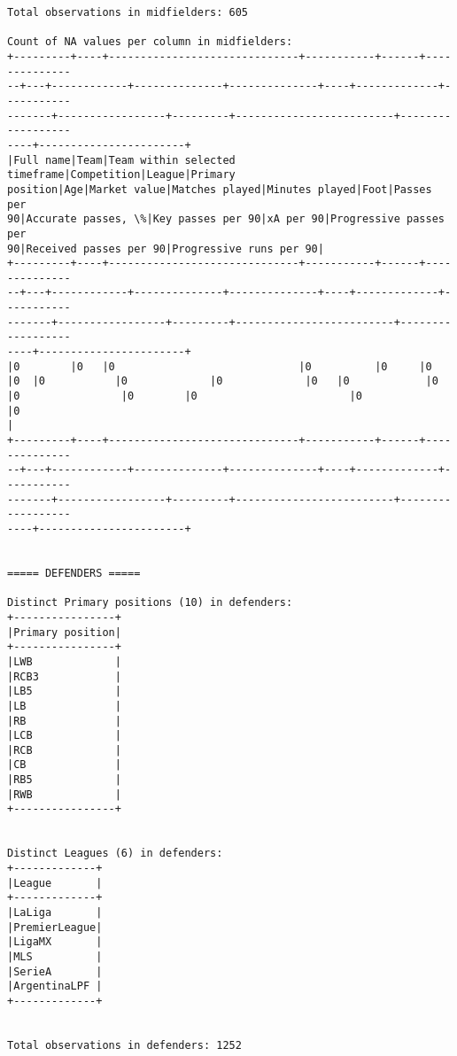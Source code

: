 \documentclass[11pt]{article}
\begin{document}
\begin{Verbatim}[commandchars=\\\{\}]
Total observations in midfielders: 605

Count of NA values per column in midfielders:
+---------+----+------------------------------+-----------+------+--------------
--+---+------------+--------------+--------------+----+-------------+-----------
-------+-----------------+---------+-------------------------+------------------
----+-----------------------+
|Full name|Team|Team within selected timeframe|Competition|League|Primary
position|Age|Market value|Matches played|Minutes played|Foot|Passes per
90|Accurate passes, \%|Key passes per 90|xA per 90|Progressive passes per
90|Received passes per 90|Progressive runs per 90|
+---------+----+------------------------------+-----------+------+--------------
--+---+------------+--------------+--------------+----+-------------+-----------
-------+-----------------+---------+-------------------------+------------------
----+-----------------------+
|0        |0   |0                             |0          |0     |0
|0  |0           |0             |0             |0   |0            |0
|0                |0        |0                        |0                     |0
|
+---------+----+------------------------------+-----------+------+--------------
--+---+------------+--------------+--------------+----+-------------+-----------
-------+-----------------+---------+-------------------------+------------------
----+-----------------------+


===== DEFENDERS =====

Distinct Primary positions (10) in defenders:
+----------------+
|Primary position|
+----------------+
|LWB             |
|RCB3            |
|LB5             |
|LB              |
|RB              |
|LCB             |
|RCB             |
|CB              |
|RB5             |
|RWB             |
+----------------+


Distinct Leagues (6) in defenders:
+-------------+
|League       |
+-------------+
|LaLiga       |
|PremierLeague|
|LigaMX       |
|MLS          |
|SerieA       |
|ArgentinaLPF |
+-------------+


Total observations in defenders: 1252


\end{Verbatim}
\end{document}
